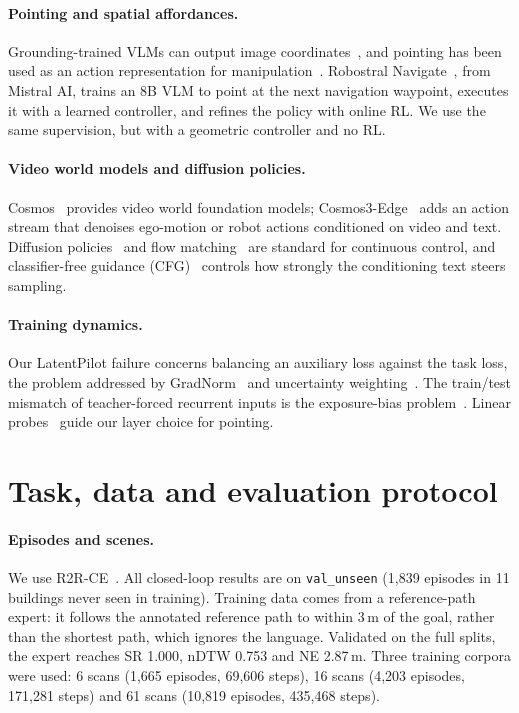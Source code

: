 \documentclass[11pt]{article}
\begin{document}
\paragraph{Pointing and spatial affordances.}
Grounding-trained VLMs can output image coordinates~\citep{deitke2024molmo}, and pointing has been used as an action
representation for manipulation~\citep{yuan2024robopoint}. Robostral Navigate~\citep{robostral}, from Mistral AI, trains an
8B VLM to point at the next navigation waypoint, executes it with a learned controller, and refines the policy with
online RL. We use the same supervision, but with a geometric controller and no RL.

\paragraph{Video world models and diffusion policies.}
Cosmos~\citep{nvidia2025cosmoswfm} provides video world foundation models; Cosmos3-Edge~\citep{nvidia2026cosmos3edge}
adds an action stream that denoises ego-motion or robot actions conditioned on video and text. Diffusion
policies~\citep{chi2023diffusionpolicy} and flow matching~\citep{lipman2023flow} are standard for continuous control, and
classifier-free guidance (CFG)~\citep{ho2022cfg} controls how strongly the conditioning text steers sampling.

\paragraph{Training dynamics.}
Our LatentPilot failure concerns balancing an auxiliary loss against the task loss, the problem addressed by
GradNorm~\citep{chen2018gradnorm} and uncertainty weighting~\citep{kendall2018multitask}. The train/test mismatch of
teacher-forced recurrent inputs is the exposure-bias problem~\citep{bengio2015scheduled,ranzato2016sequence,
ross2011dagger}. Linear probes~\citep{alain2016probes} guide our layer choice for pointing.

\section{Task, data and evaluation protocol}
\label{sec:protocol}

\paragraph{Episodes and scenes.}
We use R2R-CE~\citep{krantz2020vlnce}. All closed-loop results are on \texttt{val\_unseen} (1,839 episodes in 11
buildings never seen in training). Training data comes from a reference-path expert: it follows the annotated
reference path to within 3\,m of the goal, rather than the shortest path, which ignores the language. Validated on the
full splits, the expert reaches SR 1.000, nDTW 0.753 and NE 2.87\,m. Three training corpora were used:
6 scans (1,665 episodes, 69,606 steps), 16 scans (4,203 episodes, 171,281 steps) and 61 scans (10,819 episodes,
435,468 steps).
\end{document}
